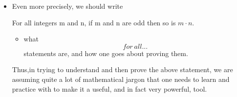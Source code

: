 \documentclass[a4paper]{article}
\begin{document}
\begin{itemize}
\item[]
Even more precisely, we should write
\begin{stat}
For all integers m and n, if m and n are odd then so is $m\cdot n$.
\end{stat}
\begin{itemize}
\item what $$for\ all ...$$ statements are, and how one goes about proving them.
\end{itemize}

Thus,in trying to understand and then prove the above statement, we are assuming quite a lot of mathematical jargon that one needs to learn and practice with to make it a useful, and in fact very powerful, tool.

\end{itemize}
\end{document}
